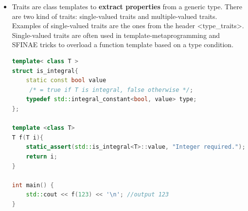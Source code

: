 \documentclass[a4paper,12pt,twoside]{book}
\begin{document}
\begin{itemize}
\item Traits are class templates to \textbf{extract properties} from a generic type. There are two kind of traits: single-valued traits and multiple-valued traits. Examples of single-valued traits are the ones from the header <type\_traits>. Single-valued traits are often used in template-metaprogramming and SFINAE tricks to overload a function template based on a type condition.
\begin{lstlisting}[frame=single, language=c++]
template< class T >
struct is_integral{
    static const bool value
     /* = true if T is integral, false otherwise */;
    typedef std::integral_constant<bool, value> type;
};

template <class T>
T f(T i){
    static_assert(std::is_integral<T>::value, "Integer required.");
    return i;
}

int main() {
    std::cout << f(123) << '\n'; //output 123
}
\end{lstlisting}
\end{itemize}
\end{document}
